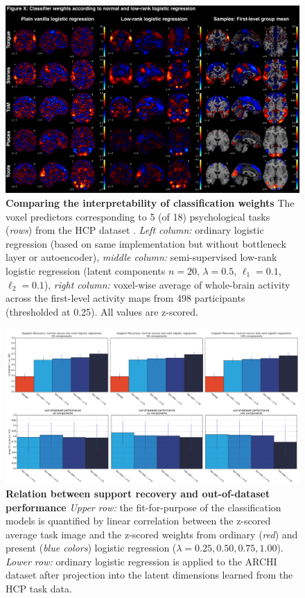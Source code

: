 \documentclass{article} %
\begin{document}
\begin{figure}
\begin{centering}
\includegraphics[width=1.00\textwidth]{figures/figure_weights.jpg}
\end{centering}
\caption{\textbf{Comparing the interpretability of classification weights}
The voxel predictors corresponding to 5 (of 18) psychological tasks (\textit{rows})
from the HCP dataset \cite{barch2013}.
\textit{Left column:} ordinary logistic regression (based on same
implementation but without bottleneck layer or autoencoder),
\textit{middle column:} semi-supervised low-rank logistic regression
(latent components $n=20$, $\lambda=0.5$, $\ell_1=0.1$, $\ell_2=0.1$),
\textit{right column:} voxel-wise average of whole-brain activity
across the first-level activity maps from 498 participants
(thresholded at 0.25).
All values are z-scored.
}
\end{figure}

\begin{figure}
\begin{centering}
\includegraphics[width=1.00\textwidth]{figures/support_bars.png}
\end{centering}
\caption{\textbf{Relation between support recovery and out-of-dataset performance}
\textit{Upper row:} the fit-for-purpose of the classification models
is quantified by linear correlation between the
z-scored average task image and the z-scored weights from
ordinary (\textit{red}) and present (\textit{blue colors}) logistic
regression ($\lambda=0.25, 0.50, 0.75, 1.00$).
\textit{Lower row:} ordinary logistic regression is applied to the
ARCHI dataset after projection into the latent dimensions learned from
the HCP task data.
}
\end{figure}
\end{document}
